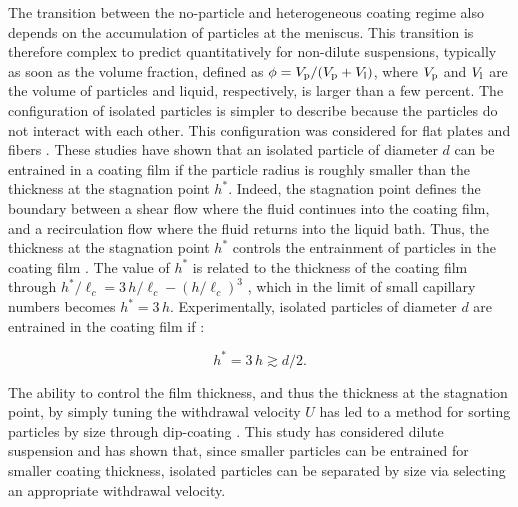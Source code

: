 \documentclass{jfm}
\begin{document}
The transition between the no-particle and heterogeneous coating regime also depends on the accumulation of particles at the meniscus. This transition is therefore complex to predict quantitatively for non-dilute suspensions, typically as soon as the volume fraction, defined as $\phi=V_{\rm p}/(V_{\rm p}+V_{\rm l})$, where $V_{\rm p}$ and $V_{\rm l}$ are the volume of particles and liquid, respectively, is larger than a few percent.
The configuration of isolated particles is simpler to describe because the particles do not interact with each other. This configuration was considered for flat plates \cite[][]{colosqui2013hydrodynamically,sauret2019capillary} and fibers \cite[][]{dincau2020entrainment}.
These studies have shown that an isolated particle of diameter $d$ can be entrained in a coating film if the particle radius is roughly smaller than the thickness at the stagnation point $h^*$. Indeed, the stagnation point defines the boundary between a shear flow where the fluid continues into the coating film, and a recirculation flow where the fluid returns into the liquid bath.
Thus, the thickness at the stagnation point $h^*$ controls the entrainment of particles in the coating film \cite[][]{colosqui2013hydrodynamically}. The value of $h^*$ is related to the thickness of the coating film through  ${h^{*}}/{\ell_{c}}=3\,{h}/{\ell_{c}}-\left({h}/{\ell_{c}}\right)^{3}$  \cite[][]{levich1942dragging}, which in the limit of small capillary numbers becomes $h^{*}=3\,h$.
Experimentally, isolated particles of diameter $d$ are entrained in the coating film if \cite[][]{sauret2019capillary,dincau2020entrainment}:

\begin{equation}
\label{eq:condition_entrainment} h^{*}=3\,h\gtrsim d/2.
\end{equation}

The ability to control the film thickness, and thus the thickness at the stagnation point, by simply tuning the withdrawal velocity $U$ has led to a method for sorting particles by size through dip-coating \cite[][]{dincau2019capillary}. This study has considered dilute suspension and has shown that, since smaller particles can be entrained for smaller coating thickness, isolated particles can be separated by size via selecting an appropriate withdrawal velocity. 
\end{document}
